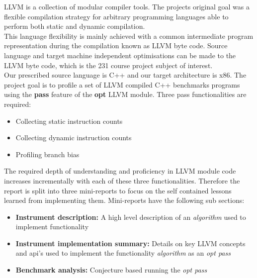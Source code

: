 LLVM is a collection of modular compiler tools. The projects original goal was a flexible compilation strategy for arbitrary programming languages able to perform both static and dynamic compilation.\\
This language flexibility is mainly achieved with a common intermediate program representation during the compilation known as LLVM byte code. Source language and target machine independent optimisations can be made to the LLVM byte code, which is the 231 course project subject of interest.\\
Our prescribed source language is C++ and our target architecture is x86. The project goal is to profile a set of LLVM compiled C++ benchmarks programs using the \textbf{pass} feature of the \textbf{opt} LLVM module.
Three pass functionalities are required:
\begin{itemize}
\item{Collecting static instruction counts}
\item{Collecting dynamic instruction counts}
\item{Profiling branch bias }
\end{itemize}
The required depth of understanding and proficiency in LLVM module code increases incrementally with each of these three functionalities. Therefore the report is split into three mini-reports to focus on the self contained lessons learned from implementing them. Mini-reports have the following sub sections:\\
\begin{itemize}
\item{\textbf{Instrument description: }A high level description of an \textit{algorithm} used to implement functionality}
\item{\textbf{Instrument implementation summary: }Details on key LLVM concepts and api's used to implement the functionality \textit{algorithm} as an \textit{opt pass}}
\item{\textbf{Benchmark analysis: }Conjecture based running the \textit{opt pass}}
\end{itemize}
